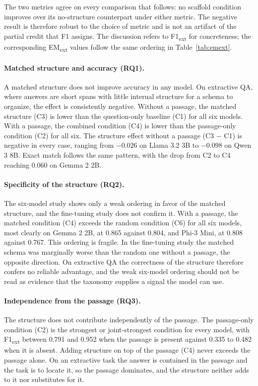 \documentclass[master]{thesis}
\begin{document}
The two metrics agree on every comparison that follows: no scaffold condition improves over its no-structure counterpart under either metric. The negative result is therefore robust to the choice of metric and is not an artifact of the partial credit that F1 assigns. The discussion refers to F1\textsubscript{ext} for concreteness; the corresponding EM\textsubscript{ext} values follow the same ordering in Table~\ref{tab:emext}.

\paragraph{Matched structure and accuracy (RQ1).}
A matched structure does not improve accuracy in any model. On extractive QA, where answers are short spans with little internal structure for a schema to organize, the effect is consistently negative. Without a passage, the matched structure (C3) is lower than the question-only baseline (C1) for all six models. With a passage, the combined condition (C4) is lower than the passage-only condition (C2) for all six. The structure effect without a passage (C3 $-$ C1) is negative in every case, ranging from $-0.026$ on Llama 3.2 3B to $-0.098$ on Qwen 3 8B. Exact match follows the same pattern, with the drop from C2 to C4 reaching 0.060 on Gemma 2 2B.

\paragraph{Specificity of the structure (RQ2).}
The six-model study shows only a weak ordering in favor of the matched structure, and the fine-tuning study does not confirm it. With a passage, the matched condition (C4) exceeds the random condition (C6) for all six models, most clearly on Gemma 2 2B, at 0.865 against 0.804, and Phi-3 Mini, at 0.808 against 0.767. This ordering is fragile. In the fine-tuning study the matched schema was marginally worse than the random one without a passage, the opposite direction. On extractive QA the correctness of the structure therefore confers no reliable advantage, and the weak six-model ordering should not be read as evidence that the taxonomy supplies a signal the model can use.

\paragraph{Independence from the passage (RQ3).}
The structure does not contribute independently of the passage. The passage-only condition (C2) is the strongest or joint-strongest condition for every model, with F1\textsubscript{ext} between 0.791 and 0.952 when the passage is present against 0.335 to 0.482 when it is absent. Adding structure on top of the passage (C4) never exceeds the passage alone. On an extractive task the answer is contained in the passage and the task is to locate it, so the passage dominates, and the structure neither adds to it nor substitutes for it.
\end{document}
